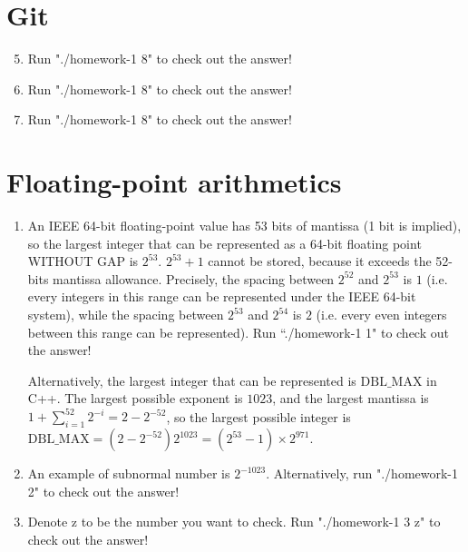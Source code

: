 \documentclass{article}    %
\begin{document}

\section{Git}

\begin{enumerate}
	\setcounter{enumi}{4}
	\item Run "./homework-1 8" to check out the answer!  
	\item Run "./homework-1 8" to check out the answer!
	\item Run "./homework-1 8" to check out the answer!
\end{enumerate}


\section{Floating-point arithmetics}

\begin{enumerate}

	\item An IEEE 64-bit floating-point value has 53 bits of mantissa (1 bit is implied), so the largest integer that can be represented as a 64-bit floating point WITHOUT GAP is $2^{53}$. $2^{53}+1$ cannot be stored, because it exceeds the 52-bits mantissa allowance. Precisely, the spacing between $2^{52}$ and $2^{53}$ is $1$ (i.e. every integers in this range can be represented under the IEEE 64-bit system), while the spacing between $2^{53}$ and $2^{54}$ is $2$ (i.e. every even integers between this range can be represented). Run ``./homework-1 1" to check out the answer!

		Alternatively, the largest integer that can be represented is $\mathrm{DBL}\_\mathrm{MAX}$ in C++. The largest possible exponent is $1023$, and the largest mantissa is $1 + \sum_{i=1}^{52} 2^{-i} = 2 - 2^{-52}$, so the largest possible integer is  $\mathrm{DBL}\_\mathrm{MAX} = (2 - 2^{-52})2^{1023} = (2^{53}-1)\times2^{971}$.

	\item An example of subnormal number is $2^{-1023}$. Alternatively, run "./homework-1 2" to check out the answer!
	
	\item Denote z to be the number you want to check. Run "./homework-1 3 z" to check out the answer!	
\end{enumerate}
\end{document}
